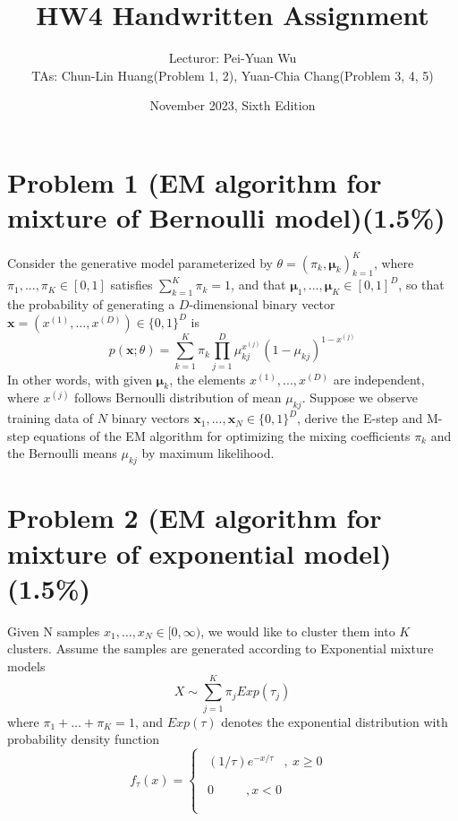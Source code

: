 \documentclass{article}
\title{HW4 Handwritten Assignment}
\author{Lecturor: Pei-Yuan Wu\\
TAs: {Chun-Lin Huang(Problem 1, 2), Yuan-Chia Chang(Problem 3, 4, 5)}}
\date{November 2023, Sixth Edition}
\def\vecx{{\mathbf x}}
\def\vecmu{{\boldsymbol \mu}}
\begin{document}
\maketitle

\section*{Problem 1 (EM algorithm for mixture of Bernoulli model)(1.5\%)}
Consider the generative model parameterized by $\theta = (\pi_k,\vecmu_k)_{k=1}^K$, where $\pi_1,...,\pi_K \in [0,1]$ satisfies $\sum_{k=1}^K\pi_k = 1$, and that $\vecmu_1,...,\vecmu_K  \in [0,1]^D$, so that the probability of generating a $D$-dimensional binary vector $\vecx = (x^{(1)},...,x^{(D)}) \in \{0,1\}^D$ is
\begin{equation*}
p(\vecx; \theta) = \sum_{k=1}^K \pi_k \prod_{j=1}^D \mu_{kj}^{x^{(j)}}(1-\mu_{kj})^{1-x^{(j)}}
\end{equation*}
%
In other words, with given $\vecmu_k$, the elements $x^{(1)},...,x^{(D)}$ are independent, where $x^{(j)}$ follows Bernoulli distribution of mean $\mu_{kj}$.  Suppose we observe training data of $N$ binary vectors $\vecx_1,...,\vecx_N \in \{0,1\}^D$, derive the E-step and M-step equations of the EM algorithm for optimizing the mixing coefficients $\pi_k$ and the Bernoulli means $\mu_{kj}$ by maximum likelihood.

\section*{Problem 2 (EM algorithm for mixture of exponential model)(1.5\%)}
Given N samples \(x_{1},\ldots,x_{N} \in \lbrack 0,\infty)\), we would
like to cluster them into \(K\) clusters. Assume the samples are
generated according to Exponential mixture models
\[X\sim\sum_{j = 1}^{K}{\pi_{j}Exp(\tau_{j})}\]
where \(\pi_{1} + \ldots + \pi_{K} = 1\), and \(Exp(\tau)\) denotes the
exponential distribution with probability density function
\[f_{\tau}(x) = \left\{ \begin{matrix}
\begin{matrix}
(1/\tau)e^{- x/\tau} & ,\ x \geq 0 \\
\end{matrix} \\
\begin{matrix}
0\ \ \ \ \ \ \ \  & ,x < 0 \\
\end{matrix} \\
\end{matrix} \right.\ \]
\end{document}
